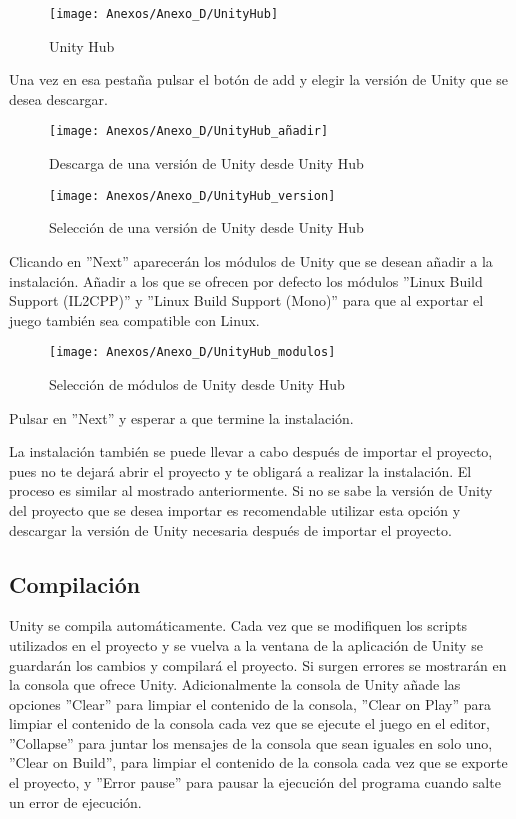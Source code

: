 \clearpage
\begin{figure}[h]
\centering
\texttt{[image: Anexos/Anexo\_D/UnityHub]}
\caption{Unity Hub}
\end{figure}

Una vez en esa pestaña pulsar el botón de add y elegir la versión de Unity que se desea descargar.

\begin{figure}[h]
\centering
\texttt{[image: Anexos/Anexo\_D/UnityHub\_añadir]}
\caption{Descarga de una versión de Unity desde Unity Hub}
\end{figure}

\clearpage
\begin{figure}[h]
\centering
\texttt{[image: Anexos/Anexo\_D/UnityHub\_version]}
\caption{Selección de una versión de Unity desde Unity Hub}
\end{figure}

Clicando en ''Next'' aparecerán los módulos de Unity que se desean añadir a la instalación. Añadir a los que se ofrecen por defecto los módulos ''Linux Build Support (IL2CPP)'' y ''Linux Build Support (Mono)'' para que al exportar el juego también sea compatible con Linux.

\begin{figure}[h]
\centering
\texttt{[image: Anexos/Anexo\_D/UnityHub\_modulos]}
\caption{Selección de módulos de Unity desde Unity Hub}
\end{figure}

Pulsar en ''Next'' y esperar a que termine la instalación.

La instalación también se puede llevar a cabo después de importar el proyecto, pues no te dejará abrir el proyecto y te obligará a realizar la instalación. El proceso es similar al mostrado anteriormente. Si no se sabe la versión de Unity del proyecto que se desea importar es recomendable utilizar esta opción y descargar la versión de Unity necesaria después de importar el proyecto.

\subsection{Compilación}
Unity se compila automáticamente. Cada vez que se modifiquen los scripts utilizados en el proyecto y se vuelva a la ventana de la aplicación de Unity se guardarán los cambios y compilará el proyecto. Si surgen errores se mostrarán en la consola que ofrece Unity.
 Adicionalmente la consola de Unity añade las opciones ''Clear'' para limpiar el contenido de la consola, ''Clear on Play'' para limpiar el contenido de la consola cada vez que se ejecute el juego en el editor, ''Collapse'' para juntar los mensajes de la consola que sean iguales en solo uno, ''Clear on Build'', para limpiar el contenido de la consola cada vez que se exporte el proyecto, y ''Error pause'' para pausar la ejecución del programa cuando salte un error de ejecución.

